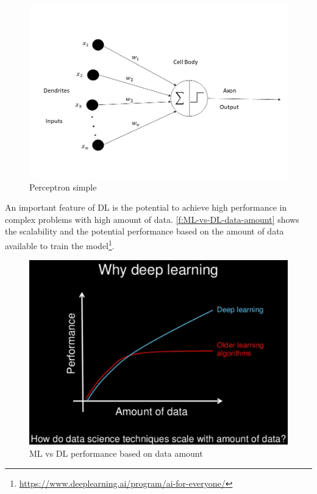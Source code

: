 \begin{figure}[h]
\centering
\includegraphics[width=\linewidth]{figures/Ch2/Perceptron.png}
\caption{Perceptron simple}
\label{f:Perceptron}
\end{figure}
 
An important feature of \ac{DL} is the potential to achieve high performance in complex problems with high amount of data. \autoref{f:ML-vs-DL-data-amount} shows the scalability and the potential performance based on the amount of data available to train the model\footnote{\url{https://www.deeplearning.ai/program/ai-for-everyone/}}.

\begin{figure}[h!]
\centering
\includegraphics[width=12cm]{figures/Ch2/MlvsDL-data-amount.png}
\caption{ML vs DL performance based on data amount}
\label{f:ML-vs-DL-data-amount}
\end{figure} 

